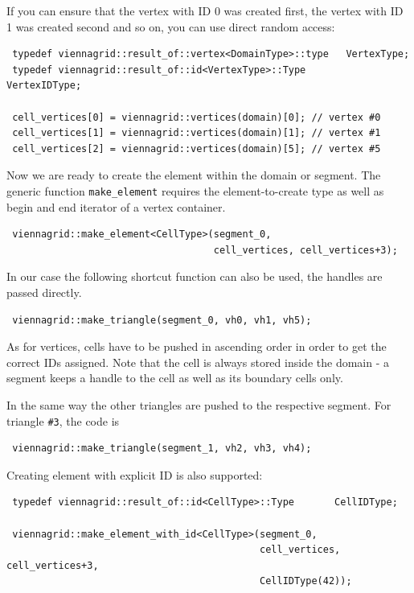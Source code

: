 If you can ensure that the vertex with ID 0 was created first, the vertex with ID 1 was created second and so on, you can use direct random access:
\begin{lstlisting}
 typedef viennagrid::result_of::vertex<DomainType>::type   VertexType;
 typedef viennagrid::result_of::id<VertexType>::Type       VertexIDType;
 
 cell_vertices[0] = viennagrid::vertices(domain)[0]; // vertex #0
 cell_vertices[1] = viennagrid::vertices(domain)[1]; // vertex #1
 cell_vertices[2] = viennagrid::vertices(domain)[5]; // vertex #5
\end{lstlisting}

Now we are ready to create the element within the domain or segment. The generic function \lstinline|make_element| requires the element-to-create type as well as begin and end iterator of a vertex container.

\begin{lstlisting}
 viennagrid::make_element<CellType>(segment_0,
                                    cell_vertices, cell_vertices+3);
\end{lstlisting}

In our case the following shortcut function can also be used, the handles are passed directly.
\begin{lstlisting}
 viennagrid::make_triangle(segment_0, vh0, vh1, vh5);
\end{lstlisting}

As for vertices, cells have to be pushed in ascending order in order to get the correct IDs assigned. Note that the cell is always stored inside the domain - a segment keeps a handle to the cell as well as its boundary cells only.

In the same way the other triangles are pushed to the respective segment. For triangle \lstinline|#3|, the code is
\begin{lstlisting}
 viennagrid::make_triangle(segment_1, vh2, vh3, vh4);
\end{lstlisting}

Creating element with explicit ID is also supported:

\begin{lstlisting}
 typedef viennagrid::result_of::id<CellType>::Type       CellIDType;
 
 viennagrid::make_element_with_id<CellType>(segment_0,
                                            cell_vertices, cell_vertices+3,
                                            CellIDType(42));
\end{lstlisting}
